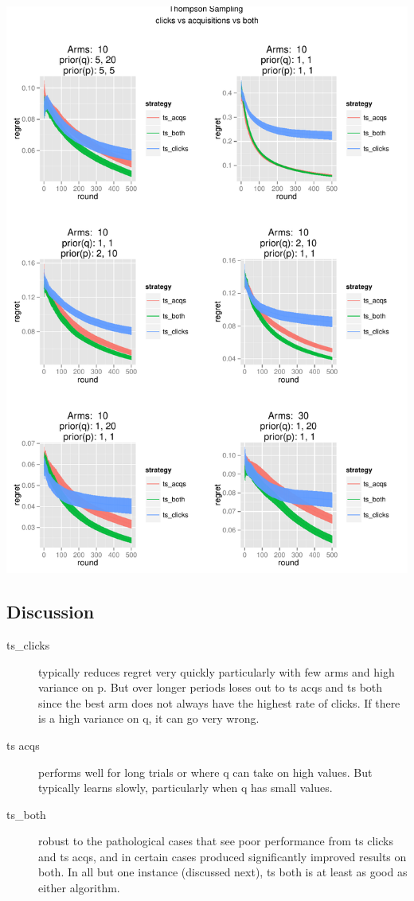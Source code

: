 \documentclass[11pt,a4,singlespacing,titlepagenumber=on]{scrreprt}
\numberwithin{equation}{chapter} %
\theoremstyle{remark}
\begin{document}
\includegraphics[scale=0.7]{P1to6.pdf}

\subsection{Discussion}

\begin{description}
	\item[ts\_clicks] typically reduces regret very quickly particularly with few arms and high variance on p. But over longer periods loses out to ts acqs and ts both since the best arm does not always have the highest rate of clicks. If there is a high variance on q, it can go very wrong.
	\item[ts acqs] performs well for long trials or where q can take on high values. But typically learns slowly, particularly when q has small values.
	\item[ts\_both] robust to the pathological cases that see poor performance from ts clicks and ts acqs, and in certain cases produced significantly improved results on both. In all but one instance (discussed next), ts both is at least as good as either algorithm.

\end{description}
\end{document}
